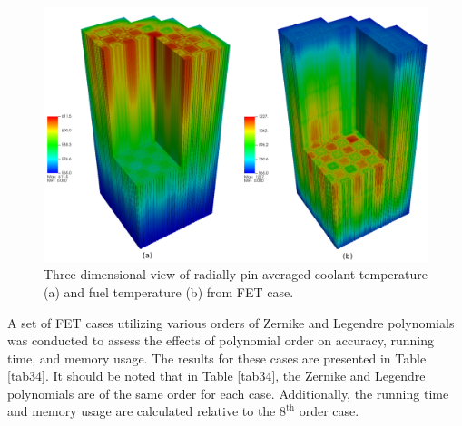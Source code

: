 \begin{figure}
    \centering
    \includegraphics[width=1.0\textwidth]{figs/fuel.pdf}
    \caption[Three-dimensional view of radially pin-averaged coolant and  fuel temperatures]{Three-dimensional view of radially pin-averaged coolant temperature (a) and fuel temperature (b) from FET case.}
    \label{fig_49b}
\end{figure}

A set of FET cases utilizing various orders of Zernike and Legendre polynomials was conducted to assess the effects of polynomial order on accuracy, running time, and memory usage. The results for these cases are presented in Table \ref{tab34}. It should be noted that in Table \ref{tab34}, the Zernike and Legendre polynomials are of the same order for each case. Additionally, the running time and memory usage are calculated relative to the $8^\text{th}$ order case.


